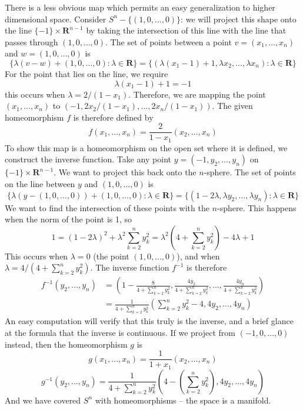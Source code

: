 \documentclass[12pt]{report}
\theoremstyle{plain}
\theoremstyle{definition}
\begin{document}

There is a less obvious map which permits an easy generalization to higher dimensional space. Consider $S^n - \{(1,0,\dots,0)\}$: we will project this shape onto the line $\{-1\} \times \mathbf{R}^{n-1}$ by taking the intersection of this line with the line that passes through $(1,0,\dots,0)$. The set of points between a point $v = (x_1,\dots,x_n)$ and $w = (1,0,\dots,0)$ is
%
\[ \{ \lambda (v - w) + (1,0,\dots,0) : \lambda \in \mathbf{R} \} = \{ (\lambda (x_1 - 1) + 1, \lambda x_2, \dots, \lambda x_n ) : \lambda \in \mathbf{R} \} \]
%
For the point that lies on the line, we require
%
\[ \lambda (x_1 - 1) + 1 = -1 \]
%
this occurs when $\lambda = 2/(1 - x_1)$. Therefore, we are mapping the point $(x_1, \dots, x_n)$ to $(-1, 2x_2/(1 - x_1), \dots, 2x_n/(1 - x_1))$. The given homeomorphism $f$ is therefore defined by
%
\[ f(x_1, \dots, x_n) = \frac{2}{1 - x_1}(x_2, \dots, x_n) \]
%
To show this map is a homeomorphism on the open set where it is defined, we construct the inverse function. Take any point $y = (-1,y_2, \dots, y_n)$ on $\{-1\} \times \mathbf{R}^{n-1}$. We want to project this back onto the $n$-sphere. The set of points on the line between $y$ and $(1,0,\dots,0)$ is
%
\[ \{ \lambda (y - (1,0,\dots,0)) + (1,0,\dots,0) : \lambda \in \mathbf{R} \} = \{ (1 - 2 \lambda, \lambda y_2, \dots, \lambda y_n) : \lambda \in \mathbf{R} \} \]
%
We want to find the intersection of these points with the $n$-sphere. This happens when the norm of the point is 1, so
%
\[ 1 = (1 - 2 \lambda)^2 + \lambda^2 \sum_{k = 2}^n y_k^2 = \lambda^2 \left(4 + \sum_{k = 2}^n y_k^2 \right) - 4\lambda + 1 \]
%
This occurs when $\lambda = 0$ (the point $(1,0,\dots,0)$), and when $\lambda = 4/(4 + \sum_{k = 2}^n y_k^2)$. The inverse function $f^{-1}$ is therefore
%
\begin{align*}
    f^{-1}(y_2, \dots, y_n) &= \left(1 - \frac{8}{4 + \sum_{k = 2}^n y_k^2}, \frac{4y_2}{4 + \sum_{k = 2}^n y_k^2}, \dots, \frac{4y_n}{4 + \sum_{k = 2}^n y_k^2} \right)\\
    &= \frac{1}{4 + \sum_{k = 2}^n y_k^2} \left( \sum_{k = 2}^n y_k^2 - 4, 4y_2, \dots, 4y_n \right)
\end{align*}
%
An easy computation will verify that this truly is the inverse, and a brief glance at the formula that the inverse is continuous. If we project from $(-1,0,\dots,0)$ instead, then the homeomorphism $g$ is
%
\[ g(x_1, \dots, x_n) = \frac{1}{1 + x_1}(x_2, \dots, x_n) \]
%
\[ g^{-1}(y_2, \dots, y_n) = \frac{1}{4 + \sum_{k = 2}^n y_k^2} \left( 4 - \left(\sum_{k = 2}^n y_k^2 \right), 4y_2, \dots, 4y_n \right) \]
%
And we have covered $S^n$ with homeomorphisms -- the space is a manifold.
\end{document}
